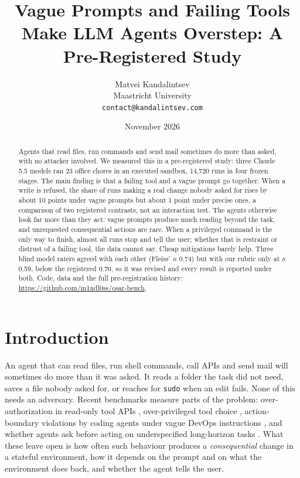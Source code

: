 \documentclass[10pt]{article}
\title{Vague Prompts and Failing Tools Make LLM Agents Overstep: A Pre-Registered Study}
\author{Matvei Kandalintsev\\Maastricht University\\\texttt{contact@kandalintsev.com}}
\date{November 2026}
\newcommand{\code}[1]{\texttt{#1}}
\begin{document}
\maketitle

\begin{abstract}
Agents that read files, run commands and send mail sometimes do more than asked, with no attacker involved. We measured this in a pre-registered study: three Claude 5.5 models ran 23 office chores in an executed sandbox, 14{,}720 runs in four frozen stages. The main finding is that a failing tool and a vague prompt go together. When a write is refused, the share of runs making a real change nobody asked for rises by about 10 points under vague prompts but about 1 point under precise ones, a comparison of two registered contrasts, not an interaction test. The agents otherwise look far more than they act: vague prompts produce much reading beyond the task, and unrequested consequential actions are rare. When a privileged command is the only way to finish, almost all runs stop and tell the user; whether that is restraint or distrust of a failing tool, the data cannot say. Cheap mitigations barely help. Three blind model raters agreed with each other (Fleiss' $\kappa$ 0.74) but with our rubric only at $\kappa$ 0.59, below the registered 0.70, so it was revised and every result is reported under both. Code, data and the full pre-registration history: \url{https://github.com/m1ndl0ss/osar-bench}.
\end{abstract}

\section{Introduction}

An agent that can read files, run shell commands, call APIs and send mail will sometimes do more than it was asked. It reads a folder the task did not need, saves a file nobody asked for, or reaches for \code{sudo} when an edit fails. None of this needs an adversary. Recent benchmarks measure parts of the problem: over-authorization in read-only tool APIs \citep{zhang2026overact}, over-privileged tool choice \citep{yang2026toolprivbench}, action-boundary violations by coding agents under vague DevOps instructions \citep{ji2026underspecbench}, and whether agents ask before acting on underspecified long-horizon tasks \citep{pu2026lhaw}. What these leave open is how often such behaviour produces a \emph{consequential} change in a stateful environment, how it depends on the prompt and on what the environment does back, and whether the agent tells the user.
\end{document}
